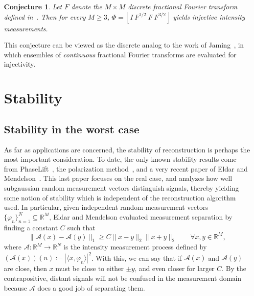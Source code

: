 \documentclass[times,10pt]{elsarticle}
\theoremstyle{plain}
\newtheorem{conjecture}[theorem]{Conjecture}
\begin{document}
\begin{conjecture}
\label{conjecture.new wrights}
Let $F$ denote the $M\times M$ discrete fractional Fourier transform defined in~\cite{CandanKO:00}.
Then for every $M\geq3$, $\Phi=[I~F^{1/2}~F~F^{3/2}]$ yields injective intensity measurements.
\end{conjecture}

This conjecture can be viewed as the discrete analog to the work of Jaming~\cite{Jaming:10}, in which ensembles of \textit{continuous} fractional Fourier transforms are evaluated for injectivity.

\section{Stability}

\subsection{Stability in the worst case}

As far as applications are concerned, the stability of reconstruction is perhaps the most important consideration.
To date, the only known stability results come from PhaseLift~\cite{CandesSV:11}, the polarization method~\cite{AlexeevBFM:12}, and a very recent paper of Eldar and Mendelson~\cite{EldarM:12}.
This last paper focuses on the real case, and analyzes how well subgaussian random measurement vectors distinguish signals, thereby yielding some notion of stability which is independent of the reconstruction algorithm used.
In particular, given independent random measurement vectors $\{\varphi_n\}_{n=1}^N\subseteq\mathbb{R}^M$, Eldar and Mendelson evaluated measurement separation by finding a constant $C$ such that
\begin{equation}
\label{eq.eldar stability}
\|\mathcal{A}(x)-\mathcal{A}(y)\|_1\geq C\|x-y\|_2\|x+y\|_2
\qquad
\forall x,y\in\mathbb{R}^M,
\end{equation}
where $\mathcal{A}\colon\mathbb{R}^M\rightarrow\mathbb{R}^N$ is the intensity measurement process defined by $(\mathcal{A}(x))(n):=|\langle x,\varphi_n\rangle|^2$.
With this, we can say that if $\mathcal{A}(x)$ and $\mathcal{A}(y)$ are close, then $x$ must be close to either $\pm y$, and even closer for larger $C$. 
By the contrapositive, distant signals will not be confused in the measurement domain because $\mathcal{A}$ does a good job of separating them.
\end{document}
